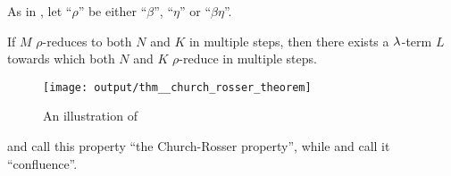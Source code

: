 \begin{theorem}\label{thm:church_rosser_theorem}
  As in , let \enquote{\( \rho \)} be either \enquote{\( \beta \)}, \enquote{\( \eta \)} or \enquote{\( \beta\eta \)}.

  If \( M \) \( \rho \)-reduces to both \( N \) and \( K \) in multiple steps, then there exists a \( \mathrm{\lambda} \)-term \( L \) towards which both \( N \) and \( K \) \( \rho \)-reduce in multiple steps.

  \begin{figure}[!ht]
    \centering
    \texttt{[image: output/thm\_\_church\_rosser\_theorem]}
    \caption{An illustration of }\label{fig:thm:church_rosser_theorem}
  \end{figure}
\end{theorem}
\begin{comments}
  \item {} and  call this property \enquote{the Church-Rosser property}, while  and  call it \enquote{confluence}.
\end{comments}
